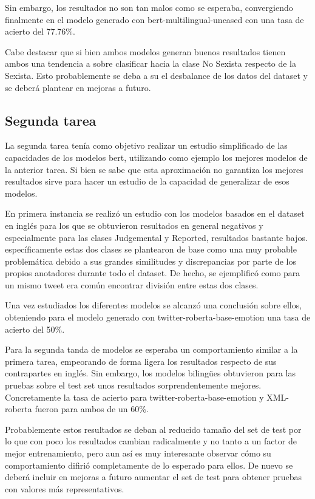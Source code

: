 Sin embargo, los resultados no son tan malos como se esperaba, convergiendo finalmente en el modelo generado con bert-multilingual-uncased con una tasa de acierto del 77.76\%.

Cabe destacar que si bien ambos modelos generan buenos resultados tienen ambos una tendencia a sobre clasificar hacia la clase No Sexista respecto de la Sexista. Esto probablemente se deba a su el desbalance de los datos del dataset y se deberá plantear en mejoras a futuro.


\subsection{Segunda tarea}

La segunda tarea tenía como objetivo realizar un estudio simplificado de las capacidades de los modelos bert, utilizando como ejemplo los mejores modelos de la anterior tarea. Si bien se sabe que esta aproximación no garantiza los mejores resultados sirve para hacer un estudio de la capacidad de generalizar de esos modelos.

En primera instancia se realizó un estudio con los modelos basados en el dataset en inglés para los que se obtuvieron resultados en general negativos y especialmente para las clases Judgemental y Reported, resultados bastante bajos. específicamente estas dos clases se plantearon de base como una muy probable problemática debido a sus grandes similitudes y discrepancias por parte de los propios anotadores durante todo el dataset. De hecho, se ejemplificó como para un mismo tweet era común encontrar división entre estas dos clases.

Una vez estudiados los diferentes modelos se alcanzó una conclusión sobre ellos, obteniendo para el modelo generado con twitter-roberta-base-emotion una tasa de acierto del 50\%. 

Para la segunda tanda de modelos se esperaba un comportamiento similar a la primera tarea, empeorando de forma ligera los resultados respecto de sus contrapartes en inglés. Sin embargo, los modelos bilingües obtuvieron para las pruebas sobre el test set unos resultados sorprendentemente mejores. Concretamente la tasa de acierto para twitter-roberta-base-emotion y XML-roberta fueron para ambos de un 60\%.

Probablemente estos resultados se deban al reducido tamaño del set de test por lo que con poco los resultados cambian radicalmente y no tanto a un factor de mejor entrenamiento, pero aun así es muy interesante observar cómo su comportamiento difirió completamente de lo esperado para ellos. De nuevo se deberá incluir en mejoras a futuro aumentar el set de test para obtener pruebas con valores más representativos.